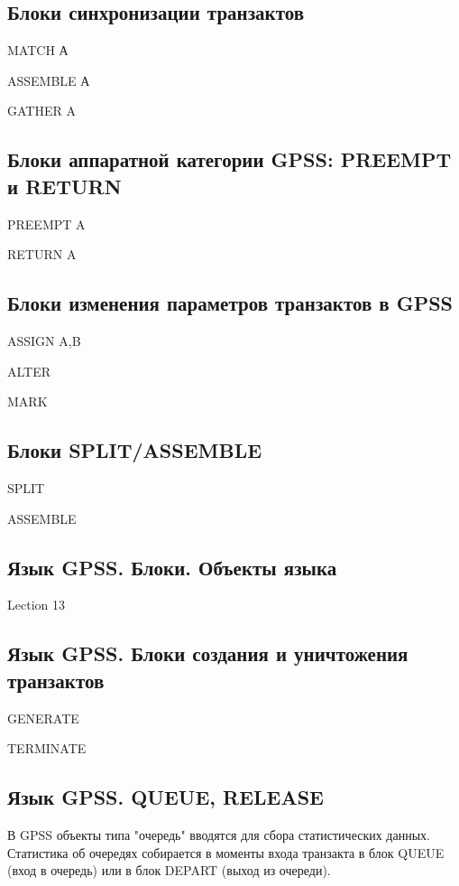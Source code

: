 \documentclass[14pt]{extarticle}
\begin{document}
\subsection*{Блоки синхронизации транзактов}

MATCH А

ASSEMBLE А

GATHER A


\subsection*{Блоки аппаратной категории GPSS: PREEMPT и RETURN}

PREEMPT A

RETURN A

\subsection*{Блоки изменения параметров транзактов в GPSS}

ASSIGN A,B

ALTER

MARK

\subsection*{Блоки SPLIT/ASSEMBLE}

SPLIT

ASSEMBLE

\subsection*{Язык GPSS. Блоки. Объекты языка}

Lection 13

\subsection*{Язык GPSS. Блоки создания и уничтожения транзактов}

GENERATE

TERMINATE

\subsection*{Язык GPSS. QUEUE, RELEASE}

В GPSS объекты типа "очередь" вводятся для сбора статистических данных. Статистика об очередях собирается в моменты входа транзакта в блок QUEUE (вход в очередь) или в блок DEPART (выход из очереди).
\end{document}
